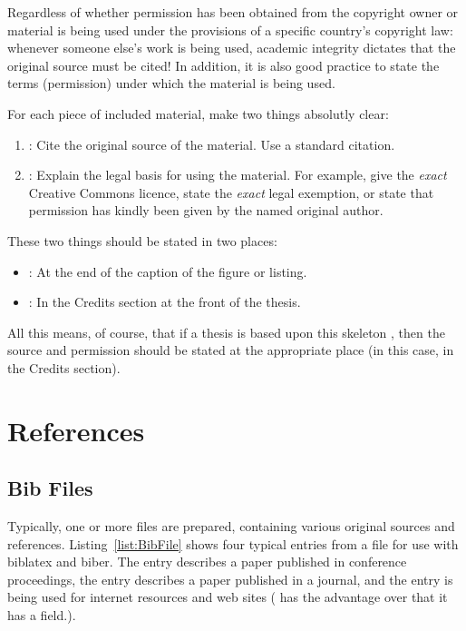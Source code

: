 Regardless of whether permission has been obtained from the copyright
owner or material is being used under the provisions of a specific
country's copyright law: whenever someone else's work is being used,
academic integrity dictates that the original source must be cited!
In addition, it is also good practice to state the terms (permission)
under which the material is being used.


For each piece of included material, make two things absolutly clear:
\begin{enumerate}
\item {}: Cite the original source of the material.
  Use a standard \LaTeXe citation.

\item {}: Explain the legal basis for using the
  material. For example, give the \emph{exact} Creative Commons
  licence, state the \emph{exact} legal exemption, or state that
  permission has kindly been given by the named original author.
\end{enumerate}


These two things should be stated in two places:
\begin{itemize}
\item {}: At the end of the caption of the figure
  or listing.

\item {}: In the Credits section at the
  front of the thesis.
\end{itemize}


All this means, of course, that if a thesis is based upon this
skeleton \citep{KeithThesis}, then the source and permission should be
stated at the appropriate place (in this case, in the Credits
section).







\section{References}



\subsection{Bib Files}

Typically, one or more  files are prepared, containing
various original sources and references.
Listing~\ref{list:BibFile} shows four typical entries from a
 file for use with biblatex and biber. The
 entry describes a paper published in conference
proceedings, the  entry describes a paper published in
a journal, and the  entry is being used for internet
resources and web sites ( has the advantage over
 that it has a  field.).



